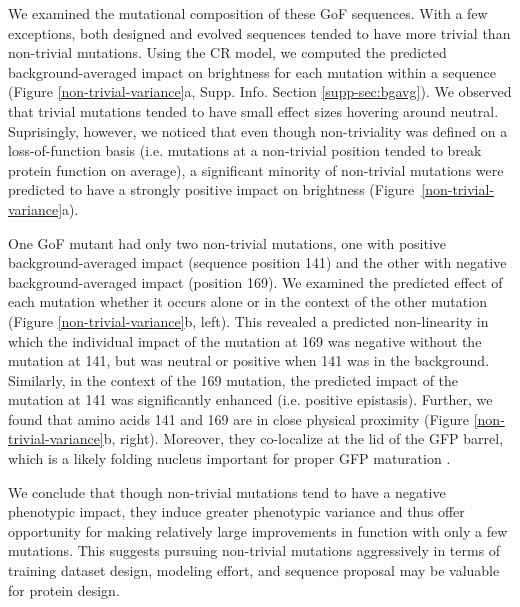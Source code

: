 We examined the mutational composition of these GoF sequences. With a few exceptions, both designed and evolved sequences tended to have more trivial than non-trivial mutations. Using the CR model, we computed the predicted background-averaged impact on brightness for each mutation within a sequence (Figure \ref{non-trivial-variance}a, Supp. Info. Section \ref{supp-sec:bgavg}). We observed that trivial mutations tended to have small effect sizes hovering around neutral. Suprisingly, however, we noticed that even though non-triviality was defined on a loss-of-function basis (i.e. mutations at a non-trivial position tended to break protein function on average), a significant minority of non-trivial mutations were predicted to have a strongly positive impact on brightness (Figure~\ref{non-trivial-variance}a).

One GoF mutant had only two non-trivial mutations, one with positive background-averaged impact (sequence position 141) and the other with negative background-averaged impact (position 169). 
We examined the predicted effect of each mutation whether it occurs alone or in the context of the other mutation (Figure \ref{non-trivial-variance}b, left). 
This revealed a predicted non-linearity in which the individual impact of the mutation at 169 was negative without the mutation at 141, but was neutral or positive when 141 was in the background. 
Similarly, in the context of the 169 mutation, the predicted impact of the mutation at 141 was significantly enhanced (i.e. positive epistasis). 
Further, we found that amino acids 141 and 169 are in close physical proximity (Figure \ref{non-trivial-variance}b, right). 
Moreover, they co-localize at the lid of the GFP barrel, which is a likely folding nucleus important for proper GFP maturation \cite{zimmer2014structural}. 

We conclude that though non-trivial mutations tend to have a negative phenotypic impact, they induce greater phenotypic variance and thus offer opportunity for making relatively large improvements in function with only a few mutations. This suggests pursuing non-trivial mutations aggressively in terms of training dataset design, modeling effort, and sequence proposal may be valuable for protein design.


